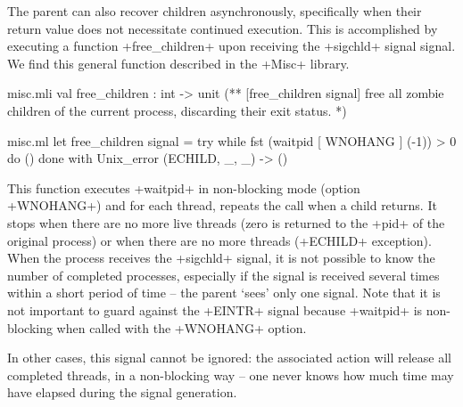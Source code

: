 \begin{example}
The parent can also recover children asynchronously, specifically
when their return value does not necessitate continued execution.
This is accomplished by executing a function \ml+free_children+ upon
receiving the \ml+sigchld+ signal signal.  We find this general function 
described in the \ml+Misc+ library.


%
\begin{codefile}{misc.mli}
val free_children : int -> unit
(** [free_children signal] free all zombie children of the current process, 
    discarding their exit status. *)
\end{codefile}
%
\begin{listingcodefile}{misc.ml}
let free_children signal = 
  try while fst (waitpid [ WNOHANG ] (-1)) > 0 do () done 
  with Unix_error (ECHILD, _, _) -> ()
\end{listingcodefile}
%
This function executes \ml+waitpid+ in non-blocking mode 
(option \ml+WNOHANG+) and for each thread, repeats
the call when a child returns.  It stops when there are
no more live threads (zero is returned to the \ml+pid+ of the
original process) or when there are no more threads
(\ml+ECHILD+ exception).  When the process receives the \ml+sigchld+ 
signal, it is not possible to know the number of completed processes, 
especially if the signal is received several times within a short 
period of time -- the parent `sees' only one signal.  Note that it 
is not important to guard against the \ml+EINTR+ signal because 
\ml+waitpid+ is non-blocking when called with the \ml+WNOHANG+ option.

In other cases, this signal cannot be ignored: the associated 
action will release all completed threads, in a non-blocking way --
one never knows how much time may have elapsed during the signal 
generation.
\end{example}

